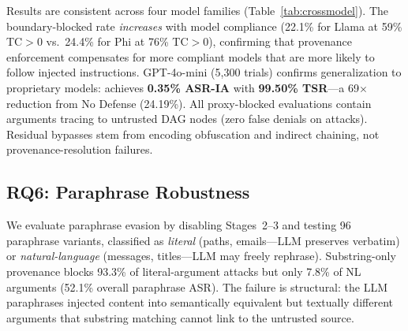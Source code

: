 Results are consistent across four model families (Table~\ref{tab:crossmodel}). The boundary-blocked rate \emph{increases} with model compliance (22.1\% for Llama at 59\% TC$>$0 vs.\ 24.4\% for Phi at 76\% TC$>$0), confirming that provenance enforcement compensates for more compliant models that are more likely to follow injected instructions.
GPT-4o-mini (5{,}300 trials) confirms generalization to proprietary models: \sys{} achieves \textbf{0.35\% ASR-IA} with \textbf{99.50\% TSR}---a 69$\times$ reduction from No Defense (24.19\%). All proxy-blocked evaluations contain arguments tracing to untrusted DAG nodes (zero false denials on attacks). Residual bypasses stem from encoding obfuscation and indirect chaining, not provenance-resolution failures.

\subsection{RQ6: Paraphrase Robustness}
\label{subsec:paraphrase}

\begin{table}[t]
\centering
\caption{Paraphrase robustness (96 tests: 32 scenarios $\times$ 3 LLM-generated variants). Embedding-enhanced provenance eliminates the NL-argument gap.}
\label{tab:paraphrase}
\small
{}
\end{table}

We evaluate paraphrase evasion by disabling Stages~2--3 and testing 96 paraphrase variants, classified as \emph{literal} (paths, emails---LLM preserves verbatim) or \emph{natural-language} (messages, titles---LLM may freely rephrase). Substring-only provenance blocks 93.3\% of literal-argument attacks but only 7.8\% of NL arguments (52.1\% overall paraphrase ASR). The failure is structural: the LLM paraphrases injected content into semantically equivalent but textually different arguments that substring matching cannot link to the untrusted source.

